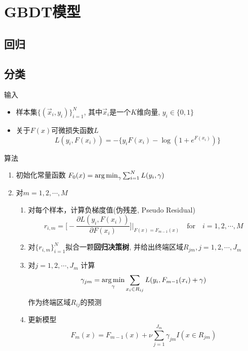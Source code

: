 \section{GBDT模型}
\subsection{回归}
\subsection{分类}

输入

\begin{itemize}
    \item 样本集$\{(\vec{x}_i, y_i)\}_{i=1}^N$, 其中$\vec{x}_i$是一个$K$维向量, $y_i\in \{0,1\} $
    \item 关于$F(x)$可微损失函数$L$
          \begin{equation*}
              L(y_i, F(x_i)) = -\Big\{y_iF(x_i) - \log (1 + e^{F(x_i)})\Big\}
          \end{equation*}
\end{itemize}

算法

\begin{enumerate}
    \item 初始化常量函数 $F_0(x) = \operatorname*{arg\,min}_\gamma \sum_{i=1}^NL(y_i, \gamma)$
    \item 对$m=1,2,\cdots, M$
          \begin{enumerate}
              \item 对每个样本，计算负梯度值(伪残差, Pseudo Residual)
                    \begin{equation*}
                        r_{i,m} = \Bigg[-\frac{\partial L(y_i, F(x_i))}{\partial F(x_i)}\Bigg]\Bigg|_{F(x)=F_{m-1}(x)} \quad \text{for} \quad i=1,2,\cdots,M
                    \end{equation*}
              \item 对$\{r_{i,m}\}_{i=1}^N$拟合一颗\textbf{回归决策树}, 并给出终端区域$R_{jm}, j=1,2,\cdots,J_m$
              \item 对$j=1,2,\cdots, J_m$ 计算
                    \begin{equation}\label{opt_gbdt_cls_reg_dt}
                        \gamma_{jm} = \operatorname*{arg\,min}_{\gamma} \sum_{x_i\in R_{ij}}L(y_i, F_{m-1}(x_i) + \gamma)
                    \end{equation}
                    作为终端区域$R_{ij}$的预测
              \item 更新模型
                    \begin{equation*}
                        F_m(x) = F_{m-1}(x) + \nu \sum_{j=1}^{J_m}\gamma_{jm}I(x\in R_{jm})
                    \end{equation*}
          \end{enumerate}
\end{enumerate}

